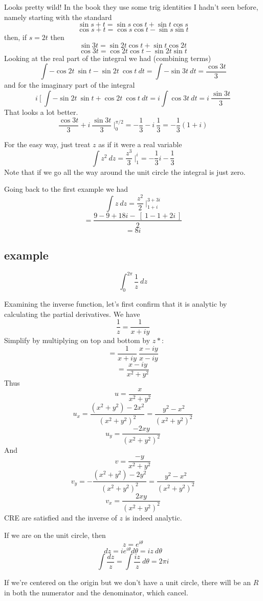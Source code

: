 \documentclass[11pt, oneside]{article}   	%
\begin{document}
Looks pretty wild!  In the book they use some trig identities I hadn't seen before, namely starting with the standard
\[ \sin s + t = \sin s \cos t + \sin t \cos s  \]
\[ \cos s + t = \cos s \cos t - \sin s \sin t \]
then, if $s = 2t$ then
\[ \sin 3t = \sin 2t \cos t + \sin t \cos 2t \]
\[ \cos 3t = \cos 2t \cos t - \sin 2t \sin t \]
Looking at the real part of the integral we had (combining terms)
\[ \int -\cos 2t \  \sin t - \sin 2t \ \cos t \ dt = \int - \sin 3t \ dt = \frac{\cos 3t}{3} \]
and for the imaginary part of the integral
\[ i \ [ \ \int - \sin 2t \ \sin t + \cos 2t \ \cos t \ dt = i \int \cos 3t \ dt = i \ \frac{\sin 3t}{3} \]
That looks a lot better.
\[ \frac{\cos 3t}{3} + i \ \frac{\sin 3t}{3} \ \bigg |_0^{\pi/2} = - \frac{1}{3} - i \ \frac{1}{3} = - \frac{1}{3} (1 + i) \]

For the easy way, just treat $z$ as if it were a real variable
\[ \int z^2 \ dz = \frac{z^3}{3} \ \bigg |_1^i = - \frac{1}{3} i - \frac{1}{3} \]
Note that if we go all the way around the unit circle the integral is just zero.

Going back to the first example we had
\[ \int z \ dz = \frac{z^2}{2} \ \bigg |_{1 + i}^{3 + 3i} \]
\[ = \frac{9 - 9 + 18i - \ [ \ 1 - 1 + 2i \ ] }{2} \]
\[ = 8i \]

\subsection*{example}
\[ \int_0^{2\pi} \frac{1}{z} \ dz \]

Examining the inverse function, let's first confirm that it is analytic by calculating the partial derivatives.  We have
\[ \frac{1}{z} = \frac{1}{x + iy} \]
Simplify by multiplying on top and bottom by $z*$:
\[ = \frac{1}{x + iy} \ \frac{x-iy}{x- iy} \]
\[ = \frac{x - iy}{x^2 + y^2} \]
Thus
\[ u = \frac{x}{x^2 + y^2} \]
\[ u_x = \frac{(x^2 + y^2) - 2x^2}{(x^2 + y^2)^2} = \frac{y^2 - x^2}{(x^2 + y^2)^2} \]
\[ u_y = \frac{-2xy}{(x^2 + y^2)^2} \]
And
\[ v =  \frac{-y}{x^2 + y^2} \]
\[ v_y = - \frac{(x^2 + y^2) - 2y^2}{(x^2 + y^2)^2} = \frac{y^2 - x^2}{(x^2 + y^2)^2} \]
\[ v_x = \frac{2xy}{(x^2 + y^2)^2} \]
CRE are satisfied and the inverse of $z$ is indeed analytic.

If we are on the unit circle, then 
\[ z = e^{i\theta} \]
\[ dz = ie^{i\theta} d \theta = iz\ d \theta \]
\[ \int \frac{dz}{z} = \int \frac{iz}{z} \ d \theta = 2 \pi i \]

If we're centered on the origin but we don't have a unit circle, there will be an $R$ in both the numerator and the denominator, which cancel.
\end{document}

